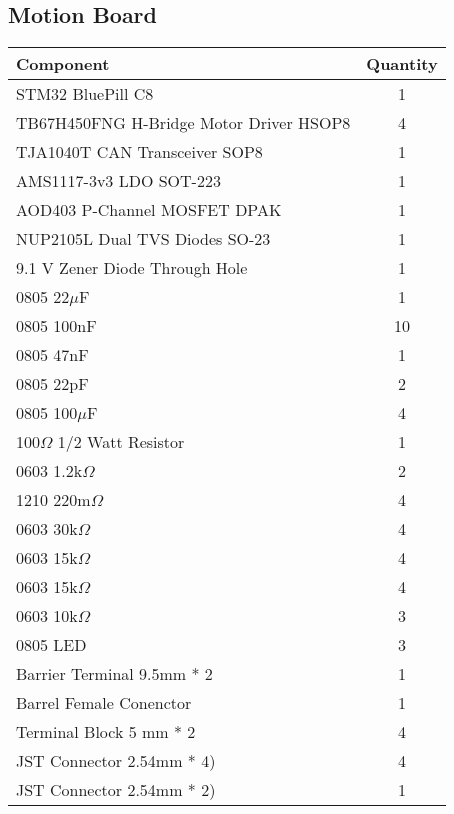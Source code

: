 \subsection{Motion Board}
\begin{center}
\setlength\extrarowheight{7pt}
\begin{tabular}{lc}
	{\large Component} & {\large Quantity} \\\midrule
	{\large STM32 BluePill C8} & {\large 1} \\
	{\large TB67H450FNG H-Bridge Motor Driver HSOP8} & {\large 4} \\
	{\large TJA1040T CAN Transceiver SOP8} & {\large 1} \\
	{\large AMS1117-3v3 LDO SOT-223} & {\large 1} \\
	{\large AOD403 P-Channel MOSFET DPAK} & {\large 1} \\
	{\large NUP2105L Dual TVS Diodes SO-23} & {\large 1} \\ 
	{\large 9.1 V Zener Diode Through Hole} & {\large 1} \\
	{\large 0805 22$\mu$F} & {\large 1} \\
	{\large 0805 100nF} & {\large 10} \\
	{\large 0805 47nF} & {\large 1} \\
	{\large 0805 22pF} & {\large 2} \\
	{\large 0805 100$\mu$F} & {\large 4} \\
	{\large 100$\Omega$ 1/2 Watt Resistor} & {\large 1} \\
	{\large 0603 1.2k$\Omega$} & {\large 2} \\
	{\large 1210 220m$\Omega$} & {\large 4} \\
	{\large 0603 30k$\Omega$} & {\large 4} \\
	{\large 0603 15k$\Omega$} & {\large 4} \\
	{\large 0603 15k$\Omega$} & {\large 4} \\
	{\large 0603 10k$\Omega$} & {\large 3} \\
	{\large 0805 LED} & {\large 3} \\
	{\large Barrier Terminal 9.5mm * 2} & {\large 1} \\
	{\large Barrel Female Conenctor} & {\large 1} \\
	{\large Terminal Block 5 mm * 2} & {\large 4} \\
	{\large JST Connector 2.54mm * 4)} & {\large 4} \\
	{\large JST Connector 2.54mm * 2)} & {\large 1} \\
\end{tabular}
\end{center}


